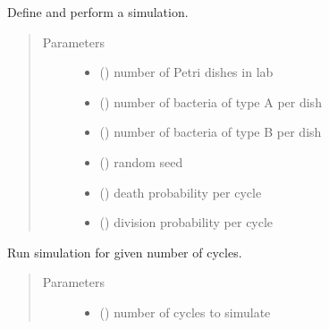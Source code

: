 \documentclass[a4paper,10pt,english]{sphinxmanual}
\begin{document}
\begin{fulllineitems}
\label{\detokenize{sim_and_lab:biolab.simulation.Sim}}
Define and perform a simulation.
\begin{quote}\begin{description}
\item[{Parameters}] \leavevmode\begin{itemize}
\item {} 
 () \textendash{} number of Petri dishes in lab

\item {} 
 () \textendash{} number of bacteria of type A per dish

\item {} 
 () \textendash{} number of bacteria of type B per dish

\item {} 
 () \textendash{} random seed

\item {} 
 () \textendash{} death probability per cycle

\item {} 
 () \textendash{} division probability per cycle

\end{itemize}

\end{description}\end{quote}

\begin{fulllineitems}
\label{\detokenize{sim_and_lab:biolab.simulation.Sim.run}}
Run simulation for given number of cycles.
\begin{quote}\begin{description}
\item[{Parameters}] \leavevmode\begin{itemize}
\item {} 
 () \textendash{} number of cycles to simulate


\end{itemize}
\end{description}
\end{quote}
\end{fulllineitems}
\end{fulllineitems}
\end{document}
